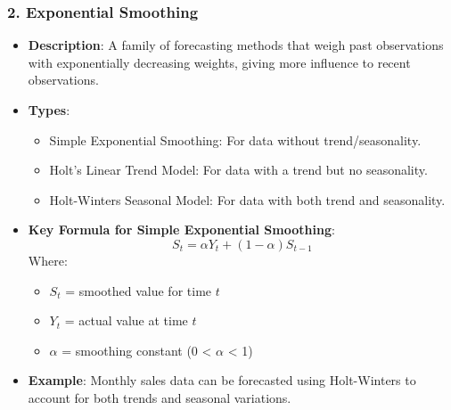 \documentclass[aspectratio=169]{beamer}
\begin{document}
\begin{frame}[fragile]
    \frametitle{2. Exponential Smoothing}
    \begin{itemize}
        \item \textbf{Description}: A family of forecasting methods that weigh past observations with exponentially decreasing weights, giving more influence to recent observations.
        \item \textbf{Types}:
        \begin{itemize}
            \item Simple Exponential Smoothing: For data without trend/seasonality.
            \item Holt’s Linear Trend Model: For data with a trend but no seasonality.
            \item Holt-Winters Seasonal Model: For data with both trend and seasonality.
        \end{itemize}
        \item \textbf{Key Formula for Simple Exponential Smoothing}:
        \begin{equation}
            S_t = \alpha Y_t + (1 - \alpha) S_{t-1}
        \end{equation}
        Where:
        \begin{itemize}
            \item $S_t$ = smoothed value for time $t$
            \item $Y_t$ = actual value at time $t$
            \item $\alpha$ = smoothing constant (0 < $\alpha$ < 1)
        \end{itemize}
        \item \textbf{Example}: Monthly sales data can be forecasted using Holt-Winters to account for both trends and seasonal variations.
    \end{itemize}
\end{frame}
\end{document}
